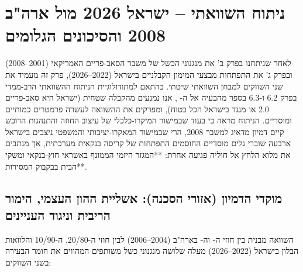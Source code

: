 
\chapter{ניתוח השוואתי – ישראל \num{2026} מול ארה"ב \num{2008} והסיכונים הגלומים}
\label{ch:comparative_analysis}

לאחר שניתחנו בפרק ב' את מנגנוני הכשל של משבר הסאב-פריים האמריקאי (\num{2001}--\num{2008}) ובפרק ג' את התפתחות מבצעי המימון הקבלניים בישראל (\num{2022}--\num{2026}), פרק זה מעמיד את שני השווקים למבחן השוואתי שיטתי. בהתאם למתודולוגיית הניתוח ההשוואתי הרב-ממדי בפרק \num{6.2} ו-\num{6.3} בספר מהבעיה אל ה- \cite{segal2026prep}, אנו נמנעים מהקבלה שטחית (ישראל היא סאב-פריים \num{2.0} או מנגד בישראל הכל בטוח), ומפרקים את ההשוואה לעשרה פרמטרים כמותיים ומוסדיים. הניתוח מראה כי בעוד שבמישור המיקרו-כלכלי של עיצוב החוזה והתנהגות הרוכש קיים דמיון מדאיג למשבר \num{2008}, הרי שבמישור המאקרו-יציבותי והמשפטי ניצבים בישראל ארבעה שוברי גלים מוסדיים החוסמים התפתחות של קריסה בנקאית מערכתית, אך מנתבים את מלוא הלחץ אל חוליה פגיעה אחרת: **המגזר היזמי הממונף באשראי חוץ-בנקאי ומשקי הבית בבקבוק המסירות**.

\section{מוקדי הדמיון (אזורי הסכנה): אשליית ההון העצמי, הימור הריבית וניגוד העניינים}
\label{sec:similarities_danger}

השוואה מבנית בין חוזי ה- וה- בארה"ב (\num{2004}--\num{2006}) לבין חוזי ה-\num{20/80}, ה-\num{10/90} והלוואות הבלון בישראל (\num{2022}--\num{2026}) מעלה שלושה מנגנוני כשל משותפים המהווים את חומר הבעירה בשני השווקים:

